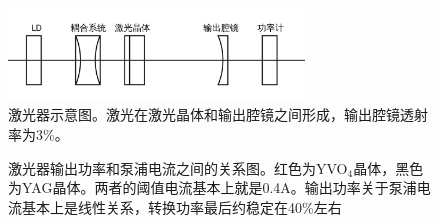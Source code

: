 \documentclass[aps,pre,12pt,preprint,onecolumn,showpacs,showkeys,UTF8]{revtex4-1}
\begin{document}
\begin{figure}[h]
	\begin{center}
		\includegraphics[width=0.7\textwidth]{pic4.png}
		\caption{\label{g:4}激光器示意图。激光在激光晶体和输出腔镜之间形成，输出腔镜透射率为3\%。}
	\end{center}
\end{figure}
\begin{figure}[h]
	\begin{center}
		\caption{\label{g:5}激光器输出功率和泵浦电流之间的关系图。红色为YVO$_4$晶体，黑色为YAG晶体。两者的阈值电流基本上就是0.4A。输出功率关于泵浦电流基本上是线性关系，转换功率最后约稳定在40\%左右}
	\end{center}
\end{figure}
\end{document}
